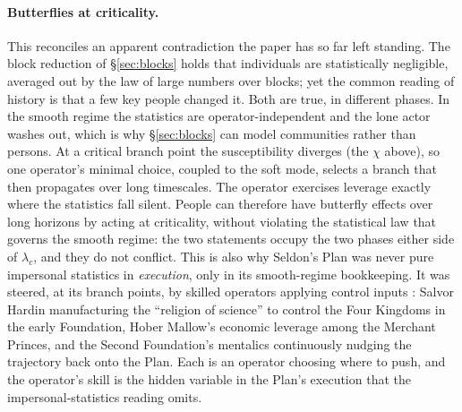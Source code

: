 \documentclass[11pt]{article}
\begin{document}
\paragraph{Butterflies at criticality.} This reconciles an apparent contradiction the paper has so far left standing. The block reduction of \S\ref{sec:blocks} holds that individuals are statistically negligible, averaged out by the law of large numbers over blocks; yet the common reading of history is that a few key people changed it. Both are true, in different phases. In the smooth regime the statistics are operator-independent and the lone actor washes out, which is why \S\ref{sec:blocks} can model communities rather than persons. At a critical branch point the susceptibility diverges (the $\chi$ above), so one operator's minimal choice, coupled to the soft mode, selects a branch that then propagates over long timescales. The operator exercises leverage exactly where the statistics fall silent. People can therefore have butterfly effects over long horizons by acting at criticality, without violating the statistical law that governs the smooth regime: the two statements occupy the two phases either side of $\lambda_c$, and they do not conflict. This is also why Seldon's Plan was never pure impersonal statistics in \emph{execution}, only in its smooth-regime bookkeeping. It was steered, at its branch points, by skilled operators applying control inputs \cite{asimov1951}: Salvor Hardin manufacturing the ``religion of science'' to control the Four Kingdoms in the early Foundation, Hober Mallow's economic leverage among the Merchant Princes, and the Second Foundation's mentalics continuously nudging the trajectory back onto the Plan. Each is an operator choosing where to push, and the operator's skill is the hidden variable in the Plan's execution that the impersonal-statistics reading omits.
\end{document}
